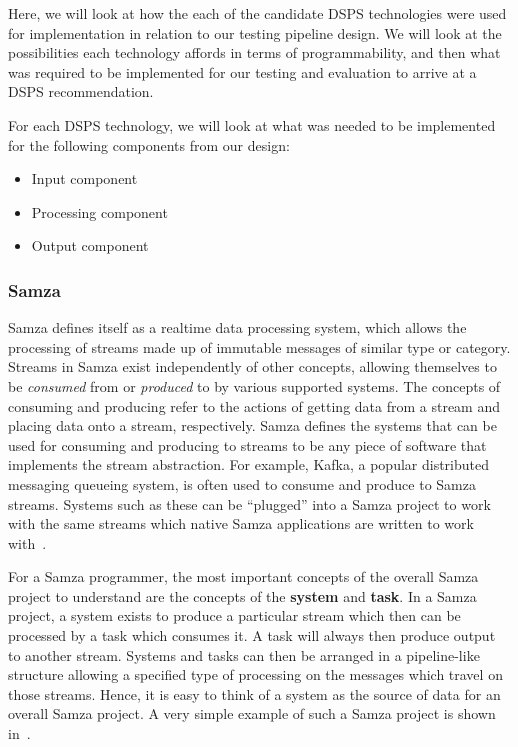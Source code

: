 Here, we will look at how the each of the candidate DSPS technologies were used for implementation in relation to our testing
pipeline design. We will look at the possibilities each technology affords in terms of programmability, and then what was
required to be implemented for our testing and evaluation to arrive at a DSPS recommendation.

For each DSPS technology, we will look at what was needed to be implemented for the following components from our design:

\begin{itemize}
  \item Input component
  \item Processing component
  \item Output component
\end{itemize}

\subsubsection{Samza} %
\label{ssub:impl_samza}

Samza defines itself as a realtime data processing system, which allows the processing of streams made up of immutable
messages of similar type or category. Streams in Samza exist independently of other concepts, allowing themselves to be
\textit{consumed} from or \textit{produced} to by various supported systems. The concepts of consuming and producing refer
to the actions of getting data from a stream and placing data onto a stream, respectively. Samza defines the systems that can be used
for consuming and producing to streams to be any piece of software that implements the stream abstraction. For example,
Kafka, a popular distributed messaging queueing system, is often used to consume and produce to Samza streams. Systems such as these can be
``plugged'' into a Samza project to work with the same streams which native Samza applications are written to work with~\cite{Samza:doc}.

For a Samza programmer, the most important concepts of the overall Samza project to understand are the concepts of the
\textbf{system} and \textbf{task}. In a Samza project, a system exists to produce a particular stream which then can
be processed by a task which consumes it. A task will always then produce output to another stream. Systems and tasks
can then be arranged in a pipeline-like structure allowing a specified type of processing on the messages which travel
on those streams. Hence, it is easy to think of a system as the source of data for an overall Samza project. A very
simple example of such a Samza project is shown in~.

